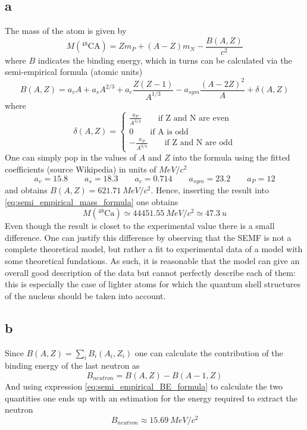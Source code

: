 \subsection*{a}
The mass of the atom is given by
\begin{equation*}
    M(^{48}\text{CA}) = Zm_P + (A-Z)m_N - \frac{B(A, Z)}{c^2}
    \label{eq:semi_empirical_mass_formula}
\end{equation*}
where $B$ indicates the binding energy, which in turns can be calculated via the semi-empirical formula (atomic units)
\begin{equation}
    B(A, Z)= a_v A + a_s A^{2/3} + a_c \frac{Z(Z-1)}{A^{1/3}} - a_{sym} \frac{(A - 2Z)^2}{A} + \delta (A, Z)
    \label{eq:semi_empirical_BE_formula}
\end{equation}
where 
\begin{equation*}
    \delta(A, Z) = 
    \begin{cases}
        \frac{a_P}{A^{3/4}} \qquad \text{if Z and N are even} \\
        0 \qquad \text{if A is odd} \\
        -\frac{a_P}{A^{3/4}} \qquad \text{if Z and N are odd} 
    \end{cases}
\end{equation*}
One can simply pop in the values of $A$ and $Z$ into the formula using the fitted coefficients (source Wikipedia) in units of $MeV/c^2$
\begin{equation*}
    a_v = 15.8 \qquad a_s = 18.3 \qquad a_c = 0.714 \qquad a_{sym} = 23.2 \qquad a_P = 12
\end{equation*}
and obtains $B(A, Z) = 621.71~MeV/c^2$. Hence, inserting the result into \ref{eq:semi_empirical_mass_formula} one obtains
\begin{equation*}
    M(^{48}\text{Ca}) \simeq 44451.55~MeV/c^2 \simeq 47.3~u
\end{equation*}
Even though the result is closet to the experimental value there is a small difference. One can justify this difference by observing that the SEMF is 
not a complete theoretical model, but rather a fit to experimental data of a model with some theoretical fundations. As such, it is reasonable that the model
can give an overall good description of the data but cannot perfectly describe each of them: this is especially the case of lighter atoms for which
the quantum shell structures of the nucleus should be taken into account.

\subsection*{b}
Since $B(A, Z) = \sum_i B_i(A_i, Z_i)$ one can calculate the contribution of the binding energy of the last neutron as 
\begin{equation*}
    B_{neutron} = B(A, Z) - B(A-1, Z)
\end{equation*}
And using expression \ref{eq:semi_empirical_BE_formula} to calculate the two quantities one ends up with an estimation for the energy required to extract the neutron
\begin{equation*}
    B_{neutron} \approx 15.69~MeV/c^2
\end{equation*}

